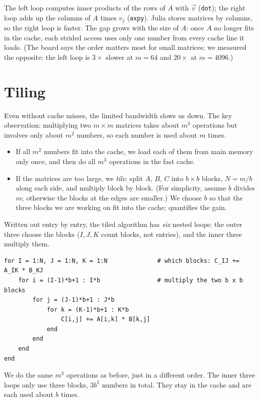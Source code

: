 The left loop computes inner products of the rows of $A$ with $\vec{v}$ (\texttt{dot}); the right loop adds up the columns of $A$ times $v_j$ (\texttt{axpy}). Julia stores matrices by columns, so the right loop is faster. The gap grows with the size of $A$: once $A$ no longer fits in the cache, each strided access uses only one number from every cache line it loads. (The board says the order matters most for small matrices; we measured the opposite: the left loop is $3\times$ slower at $m = 64$ and $20\times$ at $m = 4096$.)

\section{Tiling}
\label{sec:tiling}

Even without cache misses, the limited bandwidth slows us down. The key observation: multiplying two $m \times m$ matrices takes about $m^3$ operations but involves only about $m^2$ numbers, so each number is used about $m$ times.
\begin{itemize}
  \item If all $m^2$ numbers fit into the cache, we load each of them from main memory only once, and then do all $m^3$ operations in the fast cache.
  \item If the matrices are too large, we \emph{tile}: split $A$, $B$, $C$ into $b \times b$ blocks, $N = m/b$ along each side, and multiply block by block. (For simplicity, assume $b$ divides $m$; otherwise the blocks at the edges are smaller.) We choose $b$ so that the three blocks we are working on fit into the cache;  quantifies the gain.
\end{itemize}

Written out entry by entry, the tiled algorithm has \emph{six} nested loops: the outer three choose the blocks ($I, J, K$ count blocks, not entries), and the inner three multiply them.
\begin{lstlisting}
for I = 1:N, J = 1:N, K = 1:N              # which blocks: C_IJ += A_IK * B_KJ
    for i = (I-1)*b+1 : I*b                # multiply the two b x b blocks
        for j = (J-1)*b+1 : J*b
            for k = (K-1)*b+1 : K*b
                C[i,j] += A[i,k] * B[k,j]
            end
        end
    end
end
\end{lstlisting}
We do the same $m^3$ operations as before, just in a different order. The inner three loops only use three blocks, $3b^2$ numbers in total. They stay in the cache and are each used about $b$ times.

